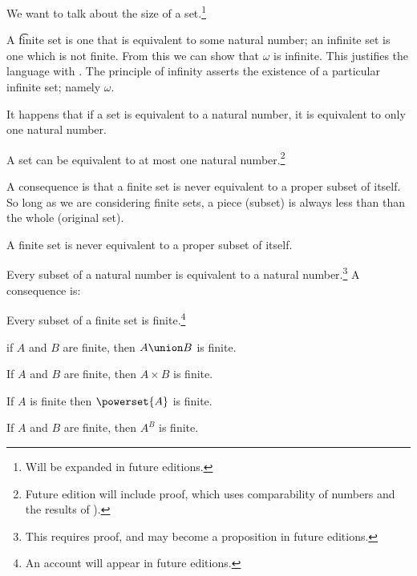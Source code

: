 

We want to talk about the size of a set.\footnote{Will be expanded in future editions.}


A \t{finite} set is one that is equivalent to some natural number; an infinite set is one which is not finite.
From this we can show that $\omega$ is infinite.
This justifies the language  with .
The principle of infinity asserts the existence of a particular infinite set; namely $\omega$.


It happens that if a set is equivalent to a natural number, it is equivalent to only one natural number.

\begin{proposition}
	A set can be equivalent to at most one natural number.\footnote{Future edition will include proof, which uses comparability of numbers and the results of ).}
\end{proposition}
A consequence is that a finite set is never equivalent to a proper subset of itself.
So long as we are considering finite sets, a piece (subset) is always less than than the whole (original set).
\begin{proposition}
	A finite set is never equivalent to a proper subset of itself.
\end{proposition}


Every subset of a natural number is equivalent to a natural number.\footnote{This requires proof, and may become a proposition in future editions.}
A consequence is:

\begin{proposition}
	Every subset of a finite set is finite.\footnote{An account will appear in future editions.}
\end{proposition}


\begin{proposition}
	if $A$ and $B$ are finite, then $A \union B$ is finite.
\end{proposition}


\begin{proposition}
	If $A$ and $B$ are finite, then $A \times B$ is finite.
\end{proposition}



\begin{proposition}
	If $A$ is finite then $\powerset{A}$ is finite.
\end{proposition}


\begin{proposition}
	If $A$ and $B$ are finite, then $A^B$ is finite.
\end{proposition}


